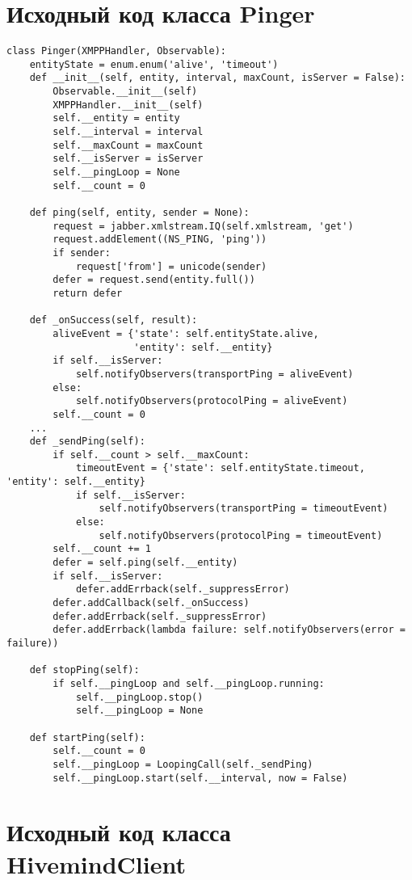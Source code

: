 \chapter{Исходный код класса Pinger}
\label{ap:Pinger}
\begin{lstlisting}
class Pinger(XMPPHandler, Observable):
    entityState = enum.enum('alive', 'timeout')
    def __init__(self, entity, interval, maxCount, isServer = False):
        Observable.__init__(self)
        XMPPHandler.__init__(self)
        self.__entity = entity
        self.__interval = interval
        self.__maxCount = maxCount
        self.__isServer = isServer
        self.__pingLoop = None
        self.__count = 0

    def ping(self, entity, sender = None):
        request = jabber.xmlstream.IQ(self.xmlstream, 'get')
        request.addElement((NS_PING, 'ping'))
        if sender:
            request['from'] = unicode(sender)
        defer = request.send(entity.full())
        return defer

    def _onSuccess(self, result):
        aliveEvent = {'state': self.entityState.alive, 
                      'entity': self.__entity}
        if self.__isServer:
            self.notifyObservers(transportPing = aliveEvent)
        else:
            self.notifyObservers(protocolPing = aliveEvent)
        self.__count = 0
    ...
    def _sendPing(self):
        if self.__count > self.__maxCount:
            timeoutEvent = {'state': self.entityState.timeout, 'entity': self.__entity}
            if self.__isServer:
                self.notifyObservers(transportPing = timeoutEvent)
            else:
                self.notifyObservers(protocolPing = timeoutEvent)
        self.__count += 1
        defer = self.ping(self.__entity)
        if self.__isServer:
            defer.addErrback(self._suppressError)
        defer.addCallback(self._onSuccess)
        defer.addErrback(self._suppressError)
        defer.addErrback(lambda failure: self.notifyObservers(error = failure))

    def stopPing(self):
        if self.__pingLoop and self.__pingLoop.running:
            self.__pingLoop.stop()
            self.__pingLoop = None

    def startPing(self):
        self.__count = 0
        self.__pingLoop = LoopingCall(self._sendPing)
        self.__pingLoop.start(self.__interval, now = False)
\end{lstlisting}

\chapter{Исходный код класса HivemindClient}
\label{ap:HivemindClient}

